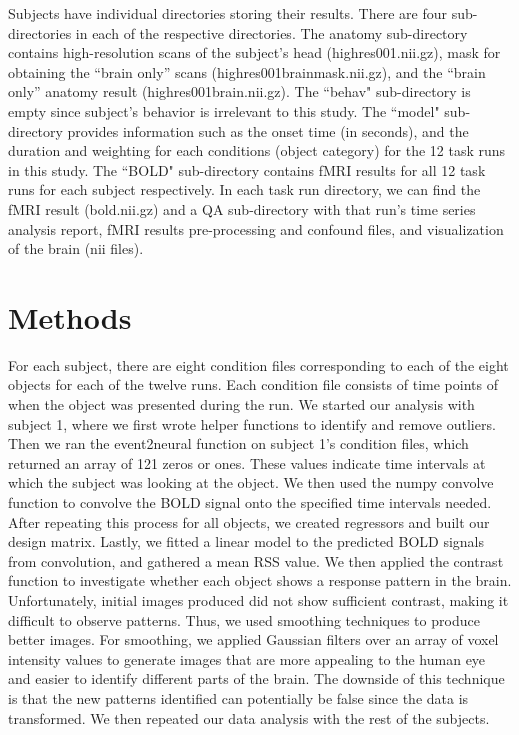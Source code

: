 \documentclass[11pt,twocolumn]{article}
\begin{document}
Subjects have individual directories storing their results. There are four 
sub-directories in each of the respective directories. The anatomy 
sub-directory contains high-resolution scans of the subject's head 
(highres001.nii.gz), mask for obtaining the ``brain only'' scans 
(highres001\textunderscore brain\textunderscore mask.nii.gz), and the 
``brain only'' anatomy result (highres001\textunderscore brain.nii.gz). 
The ``behav" sub-directory is empty since subject's behavior is irrelevant 
to this study. The ``model" sub-directory provides information such as the 
onset time (in seconds), and the duration and weighting for each conditions 
(object category) for the 12 task runs in this study. The ``BOLD" sub-directory 
contains fMRI results for all 12 task runs for each subject respectively. 
In each task run directory, we can find the fMRI result (bold.nii.gz) and 
a QA sub-directory with that run's time series analysis report, fMRI results
pre-processing and confound files, and visualization of the brain (nii files).\\ 

\section{Methods}

For each subject, there are eight condition files corresponding 
to each of the eight objects for each of the twelve runs. Each
condition file consists of time points of when the object was presented 
during the run. We started our analysis with subject 1, where we first wrote 
helper functions to identify and remove outliers.  Then we ran 
the event2neural function on subject 1's condition files, which returned an 
array of 121 zeros or ones. These values indicate
time intervals at which the subject was looking at the object.
We then used the numpy convolve function to convolve the BOLD signal 
onto the specified time intervals needed. After repeating this process 
for all objects, we created regressors and built our design matrix. 
Lastly, we fitted a linear model to the predicted BOLD signals 
from convolution, and gathered a mean RSS value. We then applied the contrast
function to investigate whether each object shows a response pattern in the brain.
Unfortunately, initial images produced did not show sufficient contrast, 
making it difficult to observe patterns. Thus, we used smoothing techniques to 
produce better images. For smoothing, we applied Gaussian filters over an
array of voxel intensity values to generate images that are more appealing
to the human eye and easier to identify different parts of the brain.
The downside of this technique is that the new patterns identified can
potentially be false since the data is transformed. We then repeated our 
data analysis with the rest of the subjects.
 \\
\end{document}
